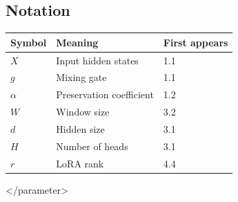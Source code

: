 \subsection{Notation}

\begin{table}[H]
\centering
\small
\begin{tabular}{lll}
\toprule
\textbf{Symbol} & \textbf{Meaning} & \textbf{First appears} \\
\midrule
$X$ & Input hidden states & 1.1 \\
$g$ & Mixing gate & 1.1 \\
$\alpha$ & Preservation coefficient & 1.2 \\
$W$ & Window size & 3.2 \\
$d$ & Hidden size & 3.1 \\
$H$ & Number of heads & 3.1 \\
$r$ & LoRA rank & 4.4 \\
\bottomrule
\end{tabular}
\end{table}
\textless{}/parameter\textgreater{}

